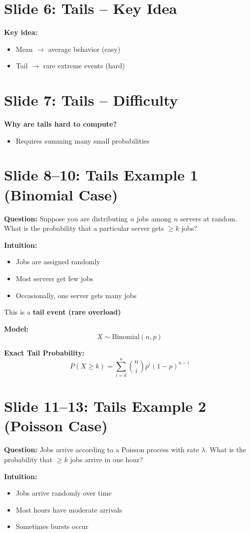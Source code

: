 \documentclass[12pt]{article}
\begin{document}
\section*{Slide 6: Tails – Key Idea}
\textbf{Key idea:}
\begin{itemize}
\item Mean $\rightarrow$ average behavior (easy)  
\item Tail $\rightarrow$ rare extreme events (hard)  
\end{itemize}

\section*{Slide 7: Tails – Difficulty}
\textbf{Why are tails hard to compute?}
\begin{itemize}
\item Requires summing many small probabilities  
\end{itemize}

\section*{Slide 8–10: Tails Example 1 (Binomial Case)}
\textbf{Question:}  
Suppose you are distributing \( n \) jobs among \( n \) servers at random.  
What is the probability that a particular server gets \( \geq k \) jobs?

\textbf{Intuition:}
\begin{itemize}
\item Jobs are assigned randomly  
\item Most servers get few jobs  
\item Occasionally, one server gets many jobs  
\end{itemize}

This is a \textbf{tail event (rare overload)}  

\textbf{Model:}
\[
X \sim \text{Binomial}(n, p)
\]

\textbf{Exact Tail Probability:}
\[
P(X \ge k) = \sum_{i=k}^{n} \binom{n}{i} p^i (1-p)^{n-i}
\]

\section*{Slide 11–13: Tails Example 2 (Poisson Case)}
\textbf{Question:}  
Jobs arrive according to a Poisson process with rate \( \lambda \).  
What is the probability that \( \geq k \) jobs arrive in one hour?

\textbf{Intuition:}
\begin{itemize}
\item Jobs arrive randomly over time  
\item Most hours have moderate arrivals  
\item Sometimes bursts occur  
\end{itemize}
\end{document}
